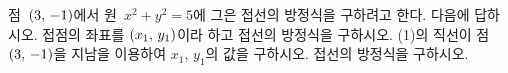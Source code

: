 점~$(3,\mkern3mu -1)$에서 원~$x^2+y^2=5$에 그은 접선의 방정식을 구하려고 한다. 다음에 답하시오.
 접점의 좌표를 $(x_1,\mkern3mu y_1)$이라 하고 접선의 방정식을 구하시오.
 (1)의 직선이 점~$(3,\mkern3mu -1)$을 지남을 이용하여 $x_1$, $y_1$의 값을 구하시오.
 접선의 방정식을 구하시오.
